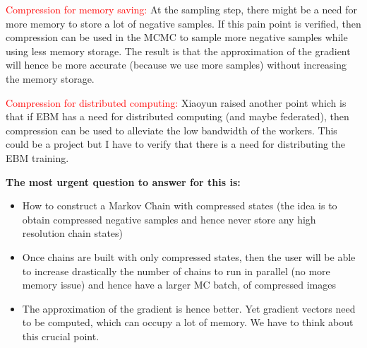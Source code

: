 \documentclass{article}
\begin{document}
\textcolor{red}{Compression for memory saving:} At the sampling step, there might be a need for more memory to store a lot of negative samples.
If this pain point is verified, then compression can be used in the MCMC to sample more negative samples while using less memory storage. 
The result is that the approximation of the gradient will hence be more accurate (because we use more samples) without increasing the memory storage.


\textcolor{red}{Compression for distributed computing:} 
Xiaoyun raised another point which is that if EBM has a need for distributed computing (and maybe federated), then compression can be used to alleviate the low bandwidth of the workers.
This could be a project but I have to verify that there is a need for distributing the EBM training.


\textbf{The most urgent question to answer for this is:}

\begin{itemize}
\item How to construct a Markov Chain with compressed states (the idea is to obtain compressed negative samples and hence never store any high resolution chain states)
\item Once chains are built with only compressed states, then the user will be able to increase drastically the number of chains to run in parallel (no more memory issue) and hence have a larger MC batch, of compressed images
\item The approximation of the gradient is hence better. Yet gradient vectors need to be computed, which can occupy a lot of memory. We have to think about this crucial point.
\end{itemize}



\end{document}
